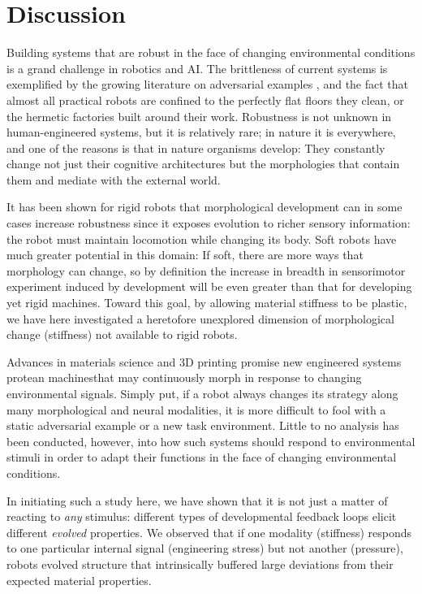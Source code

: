 \section{Discussion}
\label{sec6:discussion}


Building systems that are robust in the face of changing environmental conditions is a grand challenge in robotics and AI.
The brittleness of current systems is exemplified by the growing literature on adversarial examples
\citep{szegedy2013intriguing,
nguyen2015deep,
athalye2018synthesizing}, 
and the fact that almost all practical robots are confined to the perfectly flat floors they clean, or the hermetic factories built around their work.
Robustness is not unknown in human-engineered systems, but it is relatively rare; in nature it is everywhere, and one of the reasons is that in nature organisms develop: 
They constantly change not just their cognitive architectures but the morphologies that contain them and mediate with the external world.

It has been shown for rigid robots \citep{bongard2011morphological}
that morphological development can in some cases increase robustness since it exposes evolution to 
richer sensory information: the robot must maintain locomotion while changing its body. 
Soft robots have much greater potential in this domain:
If soft, there are more ways that morphology can change, so by definition the increase
in breadth in sensorimotor experiment induced by development will be even greater than that
for developing yet rigid machines.
Toward this goal, by allowing material stiffness to be plastic, we have here 
investigated a heretofore unexplored dimension of morphological change (stiffness) not available
to rigid robots.

Advances in materials science and 3D printing promise new engineered systems{\textemdash} protean machines{\textemdash}that may continuously morph in response to changing environmental signals.
Simply put, if a robot always changes its strategy along many morphological and neural modalities, 
it is more difficult to fool with a static adversarial example or a new task environment.
Little to no analysis has been conducted, however, into how such systems should respond to environmental stimuli in order to adapt their functions in the face of changing environmental conditions.

In initiating such a study here, we have shown that it is not just a matter of reacting to \textit{any} stimulus: different types of developmental feedback loops elicit different \textit{evolved} properties.
We observed that if one modality (stiffness) responds to one particular internal signal (engineering stress) but not another (pressure), robots evolved structure that  intrinsically buffered large deviations from their expected material properties.

